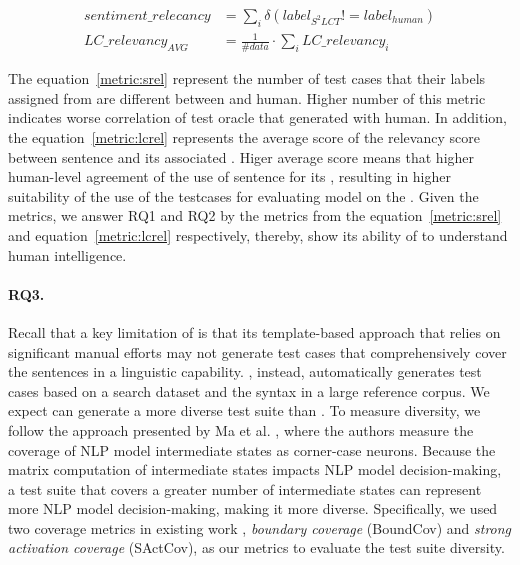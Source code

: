 \begin{eqnarray}
  sentiment\_relecancy &= \sum_{i} \delta(label_{S^2LCT}!=label_{human}) \label{metric:srel} \\
  LC\_relevancy_{AVG} &= \frac{1}{\#data}\cdot\sum_{i} LC\_relevancy_i \label{metric:lcrel}
\end{eqnarray}

The equation~\ref{metric:srel} represent the number of test cases that
their labels assigned from are different between \tool and
human. Higher number of this metric indicates worse correlation of
test oracle that \tool generated with human. In addition, the
equation~\ref{metric:lcrel} represents the average score of the
relevancy score between sentence and its associated \lc. Higer average
score means that higher human-level agreement of the use of sentence
for its \lc, resulting in higher suitability of the use of the
testcases for evaluating model on the \lc. Given the metrics, we
answer RQ1 and RQ2 by the metrics from the equation~\ref{metric:srel}
and equation~\ref{metric:lcrel} respectively, thereby, show its
ability of \tool to understand human intelligence.

\paragraph{RQ3.}
Recall that a key limitation of \Cklst is that its template-based
approach that relies on significant manual efforts may not generate
test cases that comprehensively cover the sentences in a linguistic
capability. \tool, instead, automatically generates test cases based
on a search dataset and the syntax in a large reference corpus. We
expect \tool can generate a more diverse test suite than \Cklst. To
measure diversity, we follow the approach presented by Ma et
al. \cite{ma2018deepgauge}, where the authors measure the coverage of
NLP model intermediate states as corner-case neurons.  Because the
matrix computation of intermediate states impacts NLP model
decision-making, a test suite that covers a greater number of
intermediate states can represent more NLP model decision-making,
making it more diverse.  Specifically, we used two coverage metrics in
existing work \cite{ma2018deepgauge}, \textit{boundary coverage}
(BoundCov) and \textit{strong activation coverage} (SActCov), as our
metrics to evaluate the test suite diversity.  


